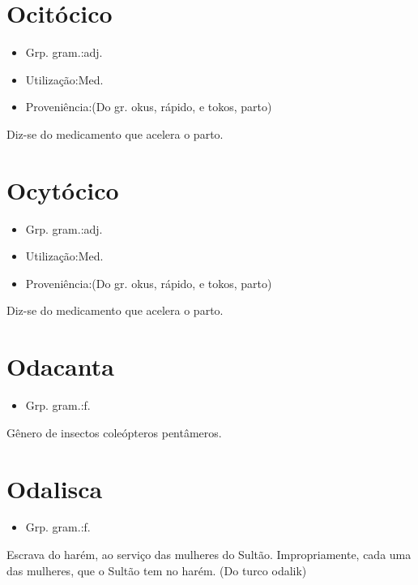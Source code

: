 \section{Ocitócico}
\begin{itemize}
\item {Grp. gram.:adj.}
\end{itemize}
\begin{itemize}
\item {Utilização:Med.}
\end{itemize}
\begin{itemize}
\item {Proveniência:(Do gr. \textunderscore okus\textunderscore , rápido, e \textunderscore tokos\textunderscore , parto)}
\end{itemize}
Diz-se do medicamento que acelera o parto.
\section{Ocytócico}
\begin{itemize}
\item {Grp. gram.:adj.}
\end{itemize}
\begin{itemize}
\item {Utilização:Med.}
\end{itemize}
\begin{itemize}
\item {Proveniência:(Do gr. \textunderscore okus\textunderscore , rápido, e \textunderscore tokos\textunderscore , parto)}
\end{itemize}
Diz-se do medicamento que acelera o parto.
\section{Odacanta}
\begin{itemize}
\item {Grp. gram.:f.}
\end{itemize}
Gênero de insectos coleópteros pentâmeros.
\section{Odalisca}
\begin{itemize}
\item {Grp. gram.:f.}
\end{itemize}
Escrava do harém, ao serviço das mulheres do Sultão.
Impropriamente, cada uma das mulheres, que o Sultão tem no harém.
(Do turco \textunderscore odalik\textunderscore )
